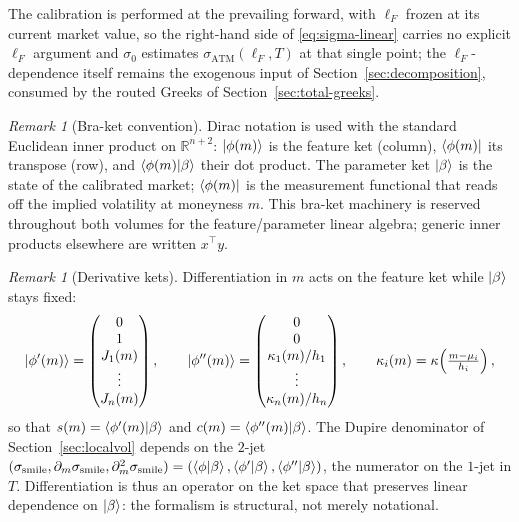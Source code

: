 \documentclass[11pt]{book}
\theoremstyle{plain}
\theoremstyle{definition}
\theoremstyle{remark}
\newtheorem{remark}[theorem]{Remark}
\newcommand{\ket}[1]{\mathinner{\lvert #1 \rangle}}
\newcommand{\bra}[1]{\mathinner{\langle #1 \rvert}}
\newcommand{\braket}[1]{\mathinner{\langle #1 \rangle}}
\newcommand{\parket}{\ket{\beta}}                %
\newcommand{\mln}{m}                             %
\newcommand{\lF}{\ell_F}                         %
\newcommand{\ssm}{\sigma_{\mathrm{smile}}}       %
\newcommand{\satm}{\sigma_{\mathrm{ATM}}}        %
\begin{document}
The calibration is performed at the prevailing forward, with $\lF$
frozen at its current market value, so the right-hand side of
\eqref{eq:sigma-linear} carries no explicit $\lF$ argument and $\sigma_0$
estimates $\satm(\lF,T)$ at that single point; the $\lF$-dependence itself
remains the exogenous input of Section~\ref{sec:decomposition}, consumed by
the routed Greeks of Section~\ref{sec:total-greeks}.

\begin{remark}[Bra-ket convention]\label{rem:braket}
Dirac notation is used with the standard Euclidean inner product on
$\mathbb{R}^{n+2}$: $\ket{\phi(\mln)}$ is the feature ket (column),
$\bra{\phi(\mln)}$ its transpose (row), and $\braket{\phi(\mln)|\beta}$ their dot
product. The parameter ket $\parket$ is the state of the calibrated market;
$\bra{\phi(\mln)}$ is the measurement functional that reads off the implied
volatility at moneyness $\mln$. This bra-ket machinery is reserved throughout
both volumes for the feature/parameter linear algebra; generic inner products
elsewhere are written $x^\top y$.
\end{remark}

\begin{remark}[Derivative kets]\label{rem:derivative-kets}
Differentiation in $\mln$ acts on the feature ket while $\parket$ stays fixed:
\[
\ket{\phi'(\mln)} = \begin{pmatrix} 0 \\ 1 \\ J_1(\mln) \\ \vdots \\ J_n(\mln)
\end{pmatrix},
\qquad
\ket{\phi''(\mln)} = \begin{pmatrix} 0 \\ 0 \\ \kappa_1(\mln)/h_1 \\ \vdots \\
\kappa_n(\mln)/h_n \end{pmatrix},
\qquad \kappa_i(\mln) = \kappa\!\left(\tfrac{\mln-\mu_i}{h_i}\right),
\]
so that $s(\mln) = \braket{\phi'(\mln)|\beta}$ and
$c(\mln) = \braket{\phi''(\mln)|\beta}$. The Dupire denominator of
Section~\ref{sec:localvol} depends on the $2$-jet
$(\ssm,\partial_\mln\ssm,\partial_\mln^2\ssm)
= (\braket{\phi|\beta},\braket{\phi'|\beta},\braket{\phi''|\beta})$, the
numerator on the $1$-jet in $T$. Differentiation is thus an operator on the ket
space that preserves linear dependence on $\parket$: the formalism is
structural, not merely notational.
\end{remark}
\end{document}
